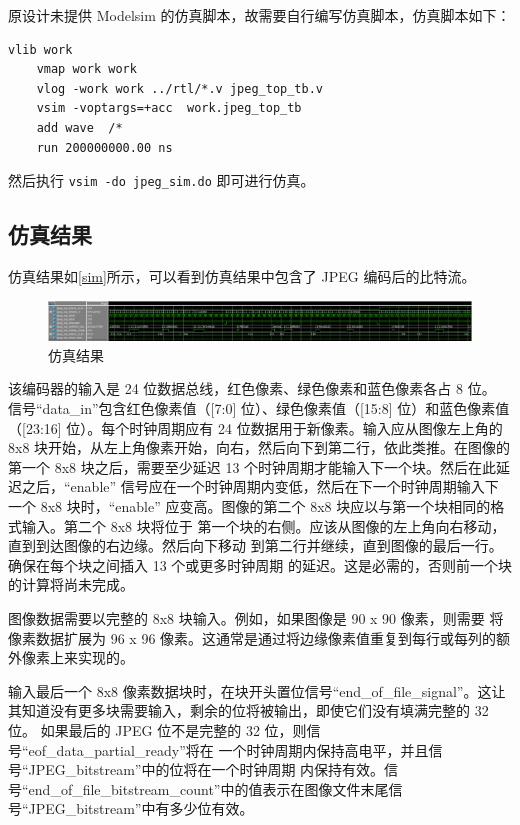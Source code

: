 \documentclass[12pt,hyperref,a4paper,UTF8]{ctexart}
\begin{document}
原设计未提供 Modelsim 的仿真脚本，故需要自行编写仿真脚本，仿真脚本如下：
\newpage
\begin{lstlisting}[style=tclstyle,name=sim.do]
    vlib work
    vmap work work
    vlog -work work ../rtl/*.v jpeg_top_tb.v
    vsim -voptargs=+acc  work.jpeg_top_tb
    add wave  /*
    run 200000000.00 ns
\end{lstlisting}

然后执行 \texttt{vsim -do jpeg\_sim.do} 即可进行仿真。

\subsection{仿真结果}
仿真结果如\autoref{sim}所示，可以看到仿真结果中包含了 JPEG 编码后的比特流。

\begin{figure}[htbp]
    \centering
    \includegraphics[width =1\textwidth]{figures/sim.png}
    \caption{仿真结果}
    \label{sim}
\end{figure}
该编码器的输入是 24 位数据总线，红色像素、绿色像素和蓝色像素各占 8 位。
信号“data\_in”包含红色像素值（[7:0] 位）、绿色像素值（[15:8] 位）和蓝色像素值
（[23:16] 位）。每个时钟周期应有 24 位数据用于新像素。输入应从图像左上角的 8x8 
块开始，从左上角像素开始，向右，然后向下到第二行，依此类推。在图像的第一个 8x8 
块之后，需要至少延迟 13 个时钟周期才能输入下一个块。然后在此延迟之后，“enable”
信号应在一个时钟周期内变低，然后在下一个时钟周期输入下一个 8x8 块时，“enable”
应变高。图像的第二个 8x8 块应以与第一个块相同的格式输入。第二个 8x8 块将位于
第一个块的右侧。应该从图像的左上角向右移动，直到到达图像的右边缘。然后向下移动
到第二行并继续，直到图像的最后一行。确保在每个块之间插入 13 个或更多时钟周期
的延迟。这是必需的，否则前一个块的计算将尚未完成。

图像数据需要以完整的 8x8 块输入。例如，如果图像是 90 x 90 像素，则需要
将像素数据扩展为 96 x 96 像素。这通常是通过将边缘像素值重复到每行或每列的额外像素上来实现的。

输入最后一个 8x8 像素数据块时，在块开头置位信号“end\_of\_file\_signal”。这让
其知道没有更多块需要输入，剩余的位将被输出，即使它们没有填满完整的 32 位。
如果最后的 JPEG 位不是完整的 32 位，则信号“eof\_data\_partial\_ready”将在
一个时钟周期内保持高电平，并且信号“JPEG\_bitstream”中的位将在一个时钟周期
内保持有效。信号“end\_of\_file\_bitstream\_count”中的值表示在图像文件末尾信
号“JPEG\_bitstream”中有多少位有效。
\end{document}
